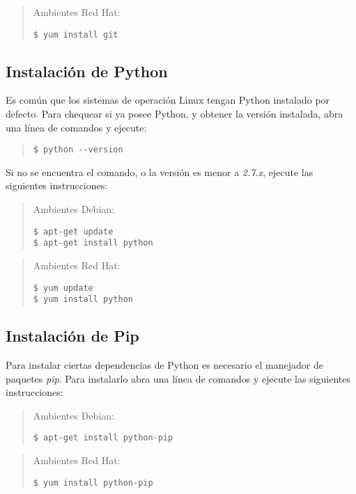 \documentclass[12pt,a4paper]{article}
\begin{document}
\begin{quote}
Ambientes Red Hat:
\begin{verbatim}
$ yum install git
\end{verbatim}
\end{quote}

\subsection{Instalación de Python}
Es común que los sistemas de operación Linux tengan Python instalado por defecto. Para chequear si ya posee Python, y obtener la versión instalada, abra una línea de comandos y ejecute:

\begin{quote}
\begin{verbatim}
$ python --version
\end{verbatim}
\end{quote}

Si no se encuentra el comando, o la versión es menor a \emph{2.7.x}, ejecute las siguientes instrucciones:

\begin{quote}
Ambientes Debian:
\begin{verbatim}
$ apt-get update
$ apt-get install python
\end{verbatim}
\end{quote}

\begin{quote}
Ambientes Red Hat:
\begin{verbatim}
$ yum update
$ yum install python
\end{verbatim}
\end{quote}

\newpage
\subsection{Instalación de Pip}
Para instalar ciertas dependencias de Python es necesario el manejador de paquetes \emph{pip}. Para instalarlo abra una línea de comandos y ejecute las siguientes instrucciones:

\begin{quote}
Ambientes Debian:
\begin{verbatim}
$ apt-get install python-pip
\end{verbatim}
\end{quote}

\begin{quote}
Ambientes Red Hat:
\begin{verbatim}
$ yum install python-pip
\end{verbatim}
\end{quote}
\end{document}
